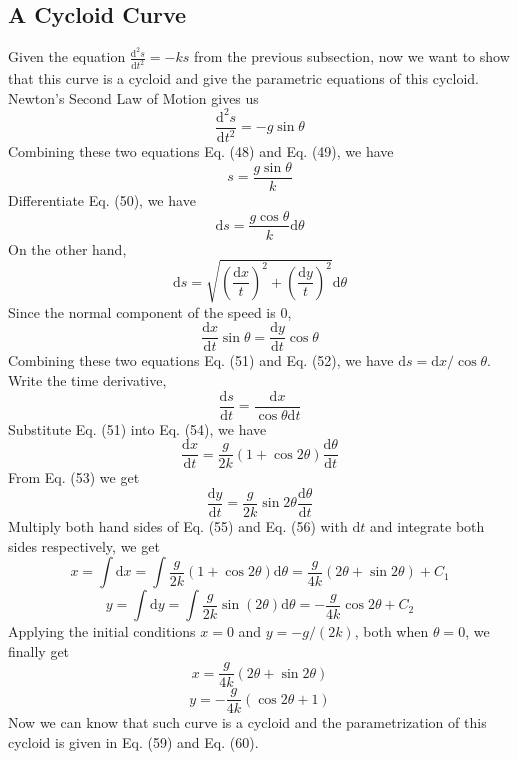 \documentclass[12pt]{report}
\begin{document}
\subsection{A Cycloid Curve}
Given the equation $\frac{\mathrm{d}^2s}{\mathrm{d}t^2}=-ks$ from the previous subsection, now we want to show that this curve is a cycloid and give the parametric equations of this cycloid. Newton's Second Law of Motion gives us
\begin{equation}
    \dfrac{\mathrm{d}^2s}{\mathrm{d}t^2}=-g\sin{\theta}
\end{equation}
Combining these two equations Eq. (48) and Eq. (49), we have
\begin{equation}
    s=\dfrac{g\sin{\theta}}{k}
\end{equation}
Differentiate Eq. (50), we have
\begin{equation}
    \mathrm{d}s=\dfrac{g\cos{\theta}}{k}\mathrm{d}\theta
\end{equation}
On the other hand,
\begin{equation}
    \mathrm{d}s=\sqrt{\left(\frac{\mathrm{d}x}{t}\right)^2+\left(\frac{\mathrm{d}y}{t}\right)^2}\mathrm{d}\theta
\end{equation}
Since the normal component of the speed is 0,
\begin{equation}
    \dfrac{\mathrm{d}x}{\mathrm{d}t}\sin{\theta}=\dfrac{\mathrm{d}y}{\mathrm{d}t}\cos{\theta}
\end{equation}
Combining these two equations Eq. (51) and Eq. (52), we have $\mathrm{d}s=\mathrm{d}x/\cos{\theta}$. Write the time derivative,
\begin{equation}
    \dfrac{\mathrm{d}s}{\mathrm{d}{t}}=\dfrac{\mathrm{d}x}{\cos{\theta}\mathrm{d}t}
\end{equation}
Substitute Eq. (51) into Eq. (54), we have
\begin{equation}
    \dfrac{\mathrm{d}x}{\mathrm{d}{t}}=\dfrac{g}{2k}(1+\cos{2\theta})\dfrac{\mathrm{d}\theta}{\mathrm{d}{t}}
\end{equation}
From Eq. (53) we get
\begin{equation}
    \dfrac{\mathrm{d}y}{\mathrm{d}{t}}=\dfrac{g}{2k}\sin{2\theta}\dfrac{\mathrm{d}\theta}{\mathrm{d}{t}}
\end{equation}
Multiply both hand sides of Eq. (55) and Eq. (56) with $\mathrm{d}t$ and integrate both sides respectively, we get
\begin{equation}
    x=\int\mathrm{d}x=\int\dfrac{g}{2k}(1+\cos{2\theta})\mathrm{d}\theta=\dfrac{g}{4k}(2\theta+\sin{2\theta})+C_1
\end{equation}
\begin{equation}
    y=\int\mathrm{d}y=\int\dfrac{g}{2k}\sin(2\theta)\mathrm{d}\theta=-\dfrac{g}{4k}\cos{2\theta}+C_2
\end{equation}
Applying the initial conditions $x=0$ and $y=-g/(2k)$, both when $\theta=0$, we finally get
\begin{equation}
    x=\dfrac{g}{4k}(2\theta+\sin{2\theta})
\end{equation}
\begin{equation}
    y=-\dfrac{g}{4k}(\cos{2\theta}+1)
\end{equation}
Now we can know that such curve is a cycloid and the parametrization of this cycloid is given in Eq. (59) and Eq. (60).
\end{document}

